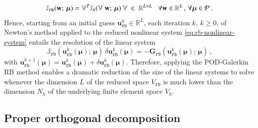 \documentclass{elsarticle}
\numberwithin{equation}{section}
\theoremstyle{theorem}
\theoremstyle{definition}
\theoremstyle{remark}
\theoremstyle{proposition}
\numberwithin{figure}{section}
\newcommand{\bg}[1]{\boldsymbol{#1}}
\begin{document}
		\begin{equation}
			\label{eq:rb-nonlinear-system-jacobian}
			\mathbb{J}_{\texttt{rb}}(\mathbf{w}; \, \bg{\mu}) = \mathbb{V}^T \mathbb{J}_h(\mathbb{V} ~ \mathbf{w}; \, \bg{\mu}) \, \mathbb{V} ~ \in ~ \mathbb{R}^{L \times L} \hspace*{0.3cm} \forall \mathbf{w} \in \mathbb{R}^L \, , \, \forall \bg{\mu} \in \mathcal{P} \, .
		\end{equation}
		Hence, starting from an initial guess $\mathbf{u}_{\texttt{rb}}^0 \in \mathbb{R}^L$, each iteration $k$, $k \geq 0$, of Newton's method applied to the reduced nonlinear system \eqref{eq:rb-nonlinear-system} entails the resolution of the linear system
		\begin{equation}
			\label{eq:rb-nonlinear-system-newton}
			\mathbb{J}_{\texttt{rb}}(\mathbf{u}_{\texttt{rb}}^k(\bg{\mu}); \, \bg{\mu}) ~ \delta \mathbf{u}_{\texttt{rb}}^k(\bg{\mu}) = - \mathbf{G}_{\texttt{rb}}(\mathbf{u}_{\texttt{rb}}^k(\bg{\mu}); \, \bg{\mu}) \, ,
		\end{equation}
		with $\mathbf{u}_{\texttt{rb}}^{k+1}(\bg{\mu}) = \mathbf{u}_{\texttt{rb}}^k(\bg{\mu}) + \delta \mathbf{u}_{\texttt{rb}}^k(\bg{\mu})$. Therefore, applying the POD-Galerkin RB method enables a dramatic reduction of the size of the linear systems to solve whenever the dimension $L$ of the reduced space $V_{\texttt{rb}}$ is much lower than the dimension ${N_h}$ of the underlying finite element space $V_h$. 
		
		
	
		
	\subsection{Proper orthogonal decomposition}
	\label{section:Proper Orthogonal Decomposition} 
		
		
\end{document}
